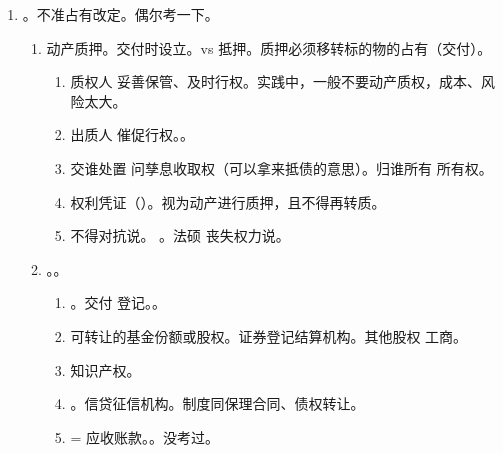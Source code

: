 \begin{enumerate}
\begin{enumerate}
\begin{enumerate}
                  \item 和主债权诉讼时效同生同死。
                  \item 加速到期。未约定 \hz 约定不明确满 2 年、破产解散清算、被查扣冻。
                \end{enumerate}
          \item 被查扣冻的不能办理抵押登记。
          \item {}。
          \item {}。抵押权人对侵害抵押财产的人享有损害赔偿请求权。。
        \end{enumerate}
  \item {}。不准占有改定。偶尔考一下。
        \begin{enumerate}
          \item 动产质押。交付时设立。vs 抵押。质押必须移转标的物的占有（交付）。
                \begin{enumerate}
                  \item 质权人 \yjt 妥善保管、及时行权。实践中，一般不要动产质权，成本、风险太大。
                  \item 出质人 \yjt 催促行权。。
                  \item 交谁处置 \yjt 问孳息收取权（可以拿来抵债的意思）。归谁所有 \yjt 所有权。
                  \item 权利凭证（）。视为动产进行质押，且不得再转质。
                  \item 不得对抗说。 \yjt {}。法硕 \yjt 丧失权力说。
                \end{enumerate}
          \item {}。。
                \begin{enumerate}
                  \item {}。交付 \hz 登记。。
                  \item 可转让的基金份额或股权。证券登记结算机构。其他股权 \yjt 工商。
                  \item 知识产权。
                  \item {}。信贷征信机构。制度同保理合同、债权转让。
                  \item {} = 应收账款。。没考过。
                \end{enumerate}

\end{enumerate}
\end{enumerate}
